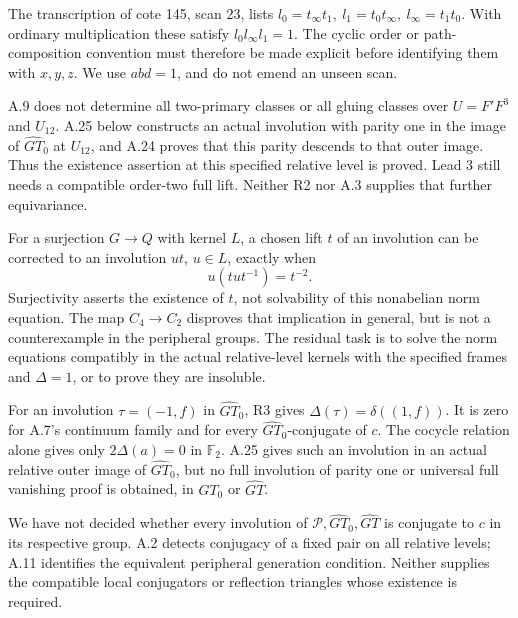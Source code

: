 The transcription of cote 145, scan 23, lists
\(l_0=t_\infty t_1,\ l_1=t_0t_\infty,\
l_\infty=t_1t_0\). With ordinary multiplication
these satisfy \(l_0l_\infty l_1=1\).
The cyclic order or path-composition convention
must therefore be made explicit before
identifying them with \(x,y,z\).
We use \(abd=1\), and do not emend an unseen scan.

A.9 does not determine all two-primary classes or all
gluing classes over \(U=F'F^3\) and \(U_{12}\).
A.25 below constructs an actual involution with
parity one in the image of \(\widehat{GT}_0\) at
\(U_{12}\), and A.24 proves that this parity
descends to that outer image. Thus the existence
assertion at this specified relative level is proved.
Lead 3 still needs a compatible order-two full lift.
Neither R2 nor A.3 supplies that further equivariance.

For a surjection \(G\to Q\) with kernel \(L\),
a chosen lift \(t\) of an involution can be
corrected to an involution \(ut\), \(u\in L\),
exactly when
\[
                    u(tut^{-1})=t^{-2}.
\]
Surjectivity asserts the existence of \(t\),
not solvability of this nonabelian norm equation.
The map \(C_4\to C_2\) disproves that implication
in general, but is not a counterexample in
the peripheral groups. The residual task is
to solve the norm equations compatibly in
the actual relative-level kernels with the
specified frames and \(\Delta=1\), or to
prove they are insoluble.

For an involution \(\tau=(-1,f)\) in
\(\widehat{GT}_0\), R3 gives
\(\Delta(\tau)=\delta((1,f))\).
It is zero for A.7's continuum family and
for every \(\widehat{GT}_0\)-conjugate of \(c\).
The cocycle relation alone gives only
\(2\Delta(a)=0\) in \(\mathbb F_2\).
A.25 gives such an involution in an actual relative
outer image of \(\widehat{GT}_0\), but no full
involution of parity one or universal full vanishing
proof is obtained, in \(\widehat{GT}_0\) or
\(\widehat{GT}\).

We have not decided whether every involution
of \(\mathcal P,\widehat{GT}_0,\widehat{GT}\)
is conjugate to \(c\) in its respective group.
A.2 detects conjugacy of a fixed pair on
all relative levels; A.11 identifies the
equivalent peripheral generation condition.
Neither supplies the compatible local
conjugators or reflection triangles whose
existence is required.

